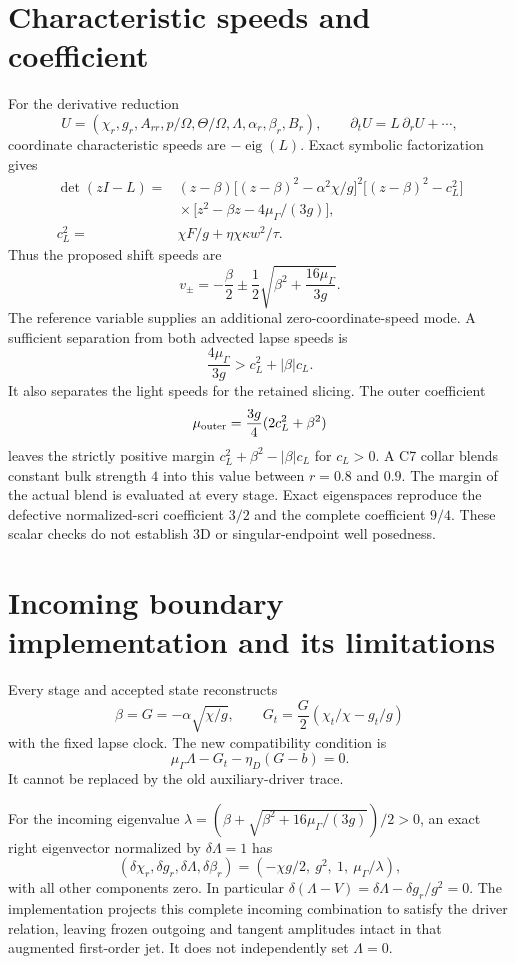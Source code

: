 \documentclass[11pt]{article}
\begin{document}
\section{Characteristic speeds and coefficient}
For the derivative reduction
\[
 U=(\chi_r,g_r,A_{rr},p/\Omega,\Theta/\Omega,\Lambda,\alpha_r,\beta_r,B_r),
 \qquad \partial_tU=L\,\partial_rU+\cdots,
\]
coordinate characteristic speeds are $-\operatorname{eig}(L)$. Exact symbolic factorization gives
\begin{align}
 \det(zI-L)={}&(z-\beta)
 \big[(z-\beta)^2-\alpha^2\chi/g\big]^2
 \big[(z-\beta)^2-c_L^2\big]\nonumber\\
 &{}\times\big[z^2-\beta z-4\mu_\Gamma/(3g)\big],\\
 c_L^2={}&\chi F/g+\eta\chi\kappa w^2/\tau .
\end{align}
Thus the proposed shift speeds are
\[
 v_\pm=-\frac{\beta}{2}\pm\frac12
       \sqrt{\beta^2+\frac{16\mu_\Gamma}{3g}}.
\]
The reference variable supplies an additional zero-coordinate-speed mode. A sufficient separation from both advected lapse speeds is
\[
 \frac{4\mu_\Gamma}{3g}>c_L^2+|\beta|c_L .
\]
It also separates the light speeds for the retained slicing. The outer coefficient
\[
 \mu_{\rm outer}=\frac{3g}{4}(2c_L^2+\beta^2)
\]
leaves the strictly positive margin $c_L^2+\beta^2-|\beta|c_L$ for $c_L>0$. A C7 collar blends constant bulk strength $4$ into this value between $r=0.8$ and $0.9$. The margin of the actual blend is evaluated at every stage. Exact eigenspaces reproduce the defective normalized-scri coefficient $3/2$ and the complete coefficient $9/4$. These scalar checks do not establish 3D or singular-endpoint well posedness.

\section{Incoming boundary implementation and its limitations}
Every stage and accepted state reconstructs
\[
 \beta=G=-\alpha\sqrt{\chi/g},\qquad
 G_t=\frac G2(\chi_t/\chi-g_t/g)
\]
with the fixed lapse clock. The new compatibility condition is
\[
 \mu_\Gamma\Lambda-G_t-\eta_D(G-b)=0 .
\]
It cannot be replaced by the old auxiliary-driver trace.

For the incoming eigenvalue
$\lambda=(\beta+\sqrt{\beta^2+16\mu_\Gamma/(3g)})/2>0$,
an exact right eigenvector normalized by $\delta\Lambda=1$ has
\[
 (\delta\chi_r,\delta g_r,\delta\Lambda,\delta\beta_r)
 =(-\chi g/2,\ g^2,\ 1,\ \mu_\Gamma/\lambda),
\]
with all other components zero. In particular
$\delta(\Lambda-V)=\delta\Lambda-\delta g_r/g^2=0$.
The implementation projects this complete incoming combination to satisfy the driver relation, leaving frozen outgoing and tangent amplitudes intact in that augmented first-order jet. It does not independently set $\Lambda=0$.
\end{document}
